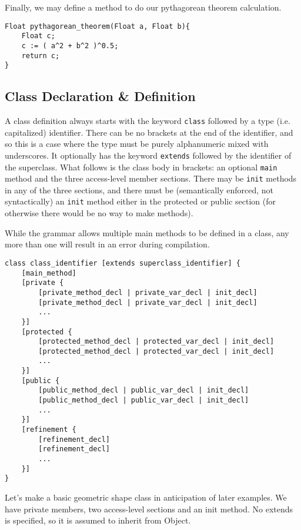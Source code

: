 Finally, we may define a method to do our pythagorean theorem calculation.

\begin{lstlisting}[label=Method Invocation,caption=Method Definition for the Pythagorean Theorem]
Float pythagorean_theorem(Float a, Float b){
    Float c;
    c := ( a^2 + b^2 )^0.5;
    return c;
}
\end{lstlisting}

\subsection{Class Declaration \& Definition}
A class definition always starts with the keyword \verb!class! followed by a type (i.e. capitalized) identifier. There can be no brackets at the end of the identifier, and so this is a case where the type must be purely alphanumeric mixed with underscores. It optionally has the keyword \verb!extends! followed by the identifier of the superclass. What follows is the class body in brackets: an optional \verb!main! method and the three access-level member sections. There may be \verb!init! methods in any of the three sections, and there must be (semantically enforced, not syntactically) an \verb!init! method either in the protected or public section (for otherwise there would be no way to make methods).

While the grammar allows multiple main methods to be defined in a class, any more than one will result in an error during compilation.

\begin{lstlisting}
class class_identifier [extends superclass_identifier] {
    [main_method]
    [private {
        [private_method_decl | private_var_decl | init_decl]
        [private_method_decl | private_var_decl | init_decl]
        ...
    }]
    [protected {
        [protected_method_decl | protected_var_decl | init_decl]
        [protected_method_decl | protected_var_decl | init_decl]
        ...
    }]
    [public {
        [public_method_decl | public_var_decl | init_decl]
        [public_method_decl | public_var_decl | init_decl]
        ...
    }]
    [refinement {
        [refinement_decl]
        [refinement_decl]
        ...
    }]
}
\end{lstlisting}

Let's make a basic geometric shape class in anticipation of later examples. We have private members, two access-level sections and an init method. No extends is specified, so it is assumed to inherit from Object.



